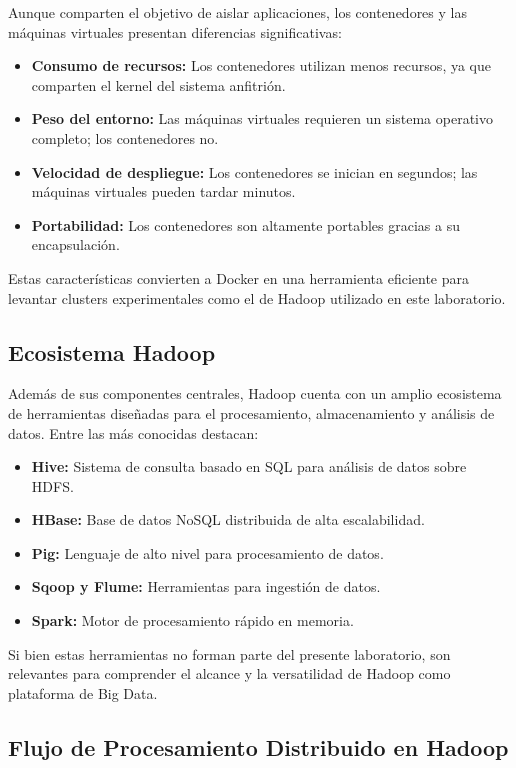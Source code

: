 Aunque comparten el objetivo de aislar aplicaciones, los contenedores y las máquinas virtuales presentan diferencias significativas:

\begin{itemize}
    \item \textbf{Consumo de recursos:} Los contenedores utilizan menos recursos, ya que comparten el kernel del sistema anfitrión.
    \item \textbf{Peso del entorno:} Las máquinas virtuales requieren un sistema operativo completo; los contenedores no.
    \item \textbf{Velocidad de despliegue:} Los contenedores se inician en segundos; las máquinas virtuales pueden tardar minutos.
    \item \textbf{Portabilidad:} Los contenedores son altamente portables gracias a su encapsulación.
\end{itemize}

Estas características convierten a Docker en una herramienta eficiente para levantar clusters experimentales como el de Hadoop utilizado en este laboratorio.

\subsection{Ecosistema Hadoop}

Además de sus componentes centrales, Hadoop cuenta con un amplio ecosistema de herramientas diseñadas para el procesamiento, almacenamiento y análisis de datos. Entre las más conocidas destacan:

\begin{itemize}
    \item \textbf{Hive:} Sistema de consulta basado en SQL para análisis de datos sobre HDFS.
    \item \textbf{HBase:} Base de datos NoSQL distribuida de alta escalabilidad.
    \item \textbf{Pig:} Lenguaje de alto nivel para procesamiento de datos.
    \item \textbf{Sqoop y Flume:} Herramientas para ingestión de datos.
    \item \textbf{Spark:} Motor de procesamiento rápido en memoria.
\end{itemize}

Si bien estas herramientas no forman parte del presente laboratorio, son relevantes para comprender el alcance y la versatilidad de Hadoop como plataforma de Big Data.

\subsection{Flujo de Procesamiento Distribuido en Hadoop}

